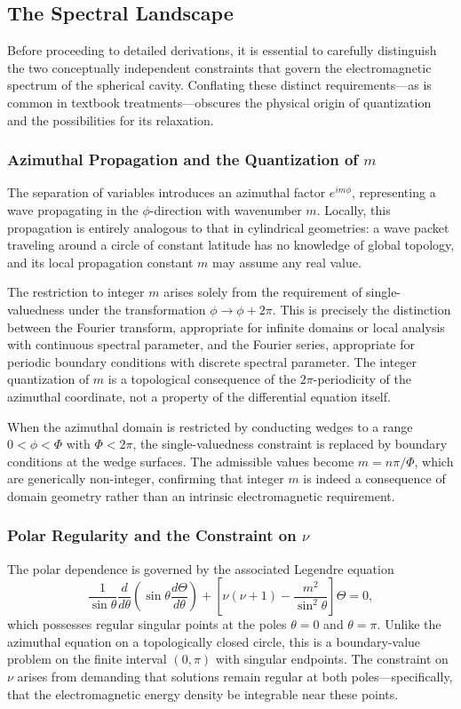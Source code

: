\documentclass[
  aip,
  amsmath,amssymb,
  preprint
]{revtex4-1}
\begin{document}
\subsection{The Spectral Landscape}

Before proceeding to detailed derivations, it is essential to carefully distinguish the two conceptually independent constraints that govern the electromagnetic spectrum of the spherical cavity. Conflating these distinct requirements---as is common in textbook treatments---obscures the physical origin of quantization and the possibilities for its relaxation.

\subsubsection{Azimuthal Propagation and the Quantization of $m$}
The separation of variables introduces an azimuthal factor $e^{im\phi}$, representing a wave propagating in the $\phi$-direction with wavenumber $m$. Locally, this propagation is entirely analogous to that in cylindrical geometries: a wave packet traveling around a circle of constant latitude has no knowledge of global topology, and its local propagation constant $m$ may assume any real value. 

The restriction to integer $m$ arises solely from the requirement of single-valuedness under the transformation $\phi \to \phi + 2\pi$. This is precisely the distinction between the Fourier transform, appropriate for infinite domains or local analysis with continuous spectral parameter, and the Fourier series, appropriate for periodic boundary conditions with discrete spectral parameter. The integer quantization of $m$ is a topological consequence of the $2\pi$-periodicity of the azimuthal coordinate, not a property of the differential equation itself.

When the azimuthal domain is restricted by conducting wedges to a range $0 < \phi < \Phi$ with $\Phi < 2\pi$, the single-valuedness constraint is replaced by boundary conditions at the wedge surfaces. The admissible values become $m = n\pi/\Phi$, which are generically non-integer, confirming that integer $m$ is indeed a consequence of domain geometry rather than an intrinsic electromagnetic requirement.

\subsubsection{Polar Regularity and the Constraint on $\nu$}
The polar dependence is governed by the associated Legendre equation
\begin{equation}
\frac{1}{\sin\theta}\frac{d}{d\theta}\left(\sin\theta\frac{d\Theta}{d\theta}\right) + \left[\nu(\nu+1) - \frac{m^2}{\sin^2\theta}\right]\Theta = 0,
\label{eq:angular_ode}
\end{equation}
which possesses regular singular points at the poles $\theta = 0$ and $\theta = \pi$. Unlike the azimuthal equation on a topologically closed circle, this is a boundary-value problem on the finite interval $(0, \pi)$ with singular endpoints. The constraint on $\nu$ arises from demanding that solutions remain regular at both poles---specifically, that the electromagnetic energy density be integrable near these points.
\end{document}
